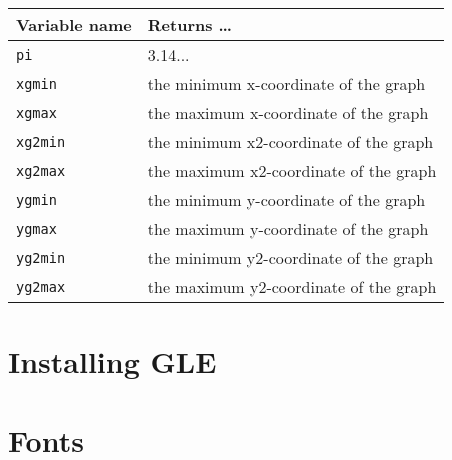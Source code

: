 \begin{supertabular}{ll} \hline
Variable name     & Returns \ldots \\ \hline
{\tt pi}  & 3.14... \\
{\tt xgmin}  & the minimum x-coordinate of the graph \\
{\tt xgmax}  & the maximum x-coordinate of the graph \\
{\tt xg2min}  & the minimum x2-coordinate of the graph \\
{\tt xg2max}  & the maximum x2-coordinate of the graph \\
{\tt ygmin}  & the minimum y-coordinate of the graph \\
{\tt ygmax}  & the maximum y-coordinate of the graph \\
{\tt yg2min}  & the minimum y2-coordinate of the graph \\
{\tt yg2max}  & the maximum y2-coordinate of the graph \\
\end{supertabular}


\newpage

\section{Installing GLE}
\label{install:app}

\section{Fonts}

 
\newpage

% 
% 
%
% 
% 
% 
% 
% 

